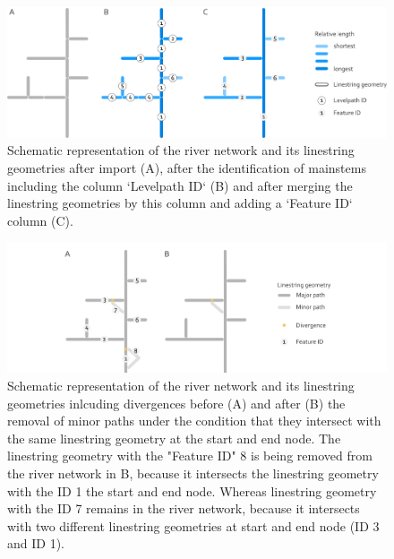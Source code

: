 \documentclass[fleqn,10pt]{wlscirep}
\begin{document}
\begin{figure}[H]

{\centering \includegraphics[width=1\linewidth]{data_descriptor/tex/mainstem_scheme} 

}

\caption{Schematic representation of the river network and its linestring geometries after import (A), after the identification of mainstems including the column `Levelpath ID` (B) and after merging the linestring geometries by this column and adding a `Feature ID` column (C).}\label{fig:mainstemscheme}
\end{figure}

\normalsize

\footnotesize

\begin{figure}[H]

{\centering \includegraphics[width=1\linewidth]{data_descriptor/tex/divergences_scheme} 

}

\caption{Schematic representation of the river network and its linestring geometries inlcuding divergences before (A) and after (B) the removal of minor paths under the condition that they intersect with the same linestring geometry at the start and end node. The linestring geometry with the "Feature ID" 8 is being removed from the river network in B, because it intersects the linestring geometry with the ID 1 the start and end node. Whereas linestring geometry with the ID 7 remains in the river network, because it intersects with two different linestring geometries at start and end node (ID 3 and ID 1).}\label{fig:divergencescheme}
\end{figure}
\end{document}
